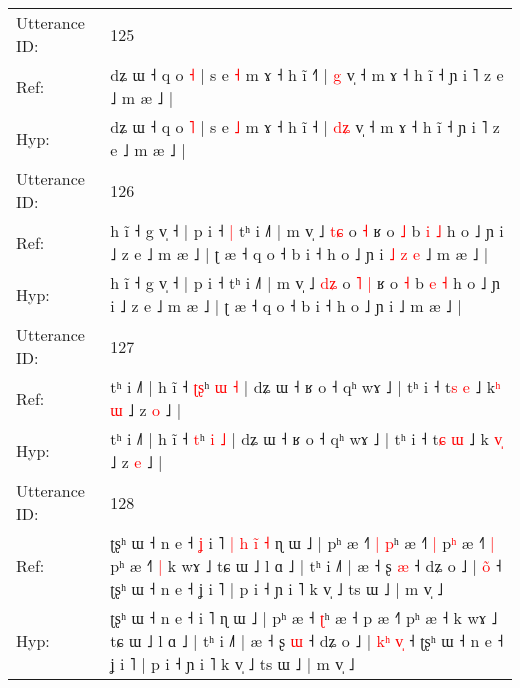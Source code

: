 \documentclass[10pt]{article}
\DeclareRobustCommand{\hl}[1]{{\textcolor{red}{#1}}}
\begin{document}
\begin{longtable}{ll}
 \\
\midrule
Utterance ID: & 125 \\
Ref: & dʑ ɯ ˧ q o \hl{˧} | s e \hl{˧} m ɤ ˧ h ĩ ˧\hl{˥} | \hl{}\hl{g} v̩ ˧ m ɤ ˧ h ĩ ˧ ɲ i ˥ z e ˩ m æ ˩ |
 \\
Hyp: & dʑ ɯ ˧ q o \hl{˥} | s e \hl{˩} m ɤ ˧ h ĩ ˧\hl{} | \hl{d}\hl{ʑ} v̩ ˧ m ɤ ˧ h ĩ ˧ ɲ i ˥ z e ˩ m æ ˩ |
 \\
\midrule
Utterance ID: & 126 \\
Ref: & h ĩ ˧ g v̩ ˧ | p i ˧\hl{ }\hl{|} tʰ i ˩˥ | m v̩ ˩ \hl{t}\hl{ɕ} o\hl{}\hl{} \hl{˧} ʁ o \hl{˩} b \hl{i} \hl{˩} h o ˩ ɲ i ˩ z e ˩ m æ ˩ | ʈ æ ˧ q o ˧ b i ˧ h o ˩ ɲ i\hl{ }\hl{˩}\hl{ }\hl{z}\hl{ }\hl{e} ˩ m æ ˩ |
 \\
Hyp: & h ĩ ˧ g v̩ ˧ | p i ˧\hl{}\hl{} tʰ i ˩˥ | m v̩ ˩ \hl{d}\hl{ʑ} o\hl{ }\hl{˥} \hl{|} ʁ o \hl{˧} b \hl{e} \hl{˧} h o ˩ ɲ i ˩ z e ˩ m æ ˩ | ʈ æ ˧ q o ˧ b i ˧ h o ˩ ɲ i\hl{}\hl{}\hl{}\hl{}\hl{}\hl{} ˩ m æ ˩ |
 \\
\midrule
Utterance ID: & 127 \\
Ref: & tʰ i ˩˥ | h ĩ ˧ \hl{ʈ}\hl{ʂ}ʰ \hl{ɯ} \hl{˧} | dʑ ɯ ˧ ʁ o ˧ qʰ wɤ ˩ | tʰ i ˧ t\hl{s} \hl{e} ˩ k\hl{ʰ}\hl{ }\hl{ɯ} ˩ z \hl{o} ˩ |
 \\
Hyp: & tʰ i ˩˥ | h ĩ ˧ \hl{}\hl{t}ʰ \hl{i} \hl{˩} | dʑ ɯ ˧ ʁ o ˧ qʰ wɤ ˩ | tʰ i ˧ t\hl{ɕ} \hl{ɯ} ˩ k\hl{ }\hl{v}\hl{̩} ˩ z \hl{e} ˩ |
 \\
\midrule
Utterance ID: & 128 \\
Ref: & ʈʂʰ ɯ ˧ n e ˧\hl{ }\hl{ʝ} i ˥\hl{ }\hl{|}\hl{ }\hl{h}\hl{ }\hl{i}\hl{̃}\hl{ }\hl{˧} ɳ ɯ ˩ | pʰ æ ˧\hl{˥}\hl{ }\hl{|} \hl{p}ʰ æ ˧\hl{˥}\hl{ }\hl{|} p\hl{ʰ} æ ˧˥\hl{ }\hl{|} pʰ æ ˧\hl{˥}\hl{ }\hl{|} k wɤ ˩ tɕ ɯ ˩ l ɑ ˩ | tʰ i ˩˥ | æ ˧ ʂ \hl{æ} ˧ dʑ o ˩ |\hl{}\hl{}\hl{} \hl{o}\hl{̃} ˧ ʈʂʰ ɯ ˧ n e ˧ ʝ i ˥ | p i ˧ ɲ i ˥ k v̩ ˩ ts ɯ ˩ | m v̩ ˩
 \\
Hyp: & ʈʂʰ ɯ ˧ n e ˧\hl{}\hl{} i ˥\hl{}\hl{}\hl{}\hl{}\hl{}\hl{}\hl{}\hl{}\hl{} ɳ ɯ ˩ | pʰ æ ˧\hl{}\hl{}\hl{} \hl{ʈ}ʰ æ ˧\hl{}\hl{}\hl{} p\hl{} æ ˧˥\hl{}\hl{} pʰ æ ˧\hl{}\hl{}\hl{} k wɤ ˩ tɕ ɯ ˩ l ɑ ˩ | tʰ i ˩˥ | æ ˧ ʂ \hl{ɯ} ˧ dʑ o ˩ |\hl{ }\hl{k}\hl{ʰ} \hl{v}\hl{̩} ˧ ʈʂʰ ɯ ˧ n e ˧ ʝ i ˥ | p i ˧ ɲ i ˥ k v̩ ˩ ts ɯ ˩ | m v̩ ˩
 \\
\midrule
\end{longtable}
\end{document}
